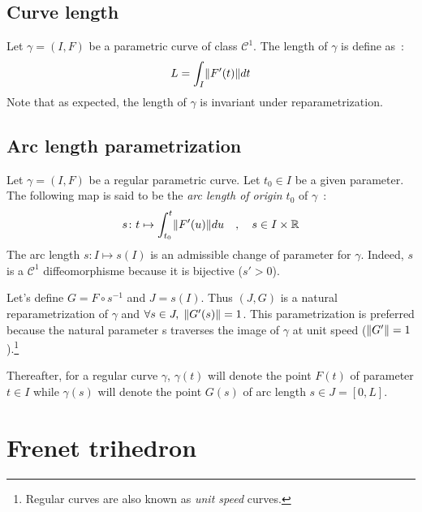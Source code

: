 \subsection{Curve length}
Let $\gamma=(I,F)$ be a parametric curve of class ${\mathcal{C}}^{1}$. The length of $\gamma$ is define as~:
\begin{equation}
	L=\int_{I}\lVert F'(t)\rVert dt
\end{equation}
Note that as expected, the length of $\gamma$ is invariant under reparametrization.

\subsection{Arc length parametrization}\label{sec:arclength_param}

Let $\gamma=(I,F)$ be a regular parametric curve. Let $t_0 \in I$ be a given parameter. The following map is said to be the \emph{arc length of origin $t_0$} of $\gamma$~:
\begin{equation}
	s \colon t \mapsto \int_{t_{0}}^{t}\lVert F'(u)\rVert du
	\quad,\quad
	s \in I \times \mathbb{R}
\end{equation}
The arc length $s \colon I\mapsto s(I)$ is an admissible change of parameter for $\gamma$. Indeed, $s$ is a ${\mathcal{C}}^{1}$ diffeomorphisme because it is bijective ($s'>0$).

Let's define $G=F\circ s^{-1}$ and $J=s(I)$. Thus $(J,G)$ is a natural reparametrization of $\gamma$ and  $\forall s \in J,\; \lVert G'(s)\rVert = 1$. This parametrization is preferred because the natural parameter s traverses the image of $\gamma$ at unit speed ($\lVert G'\rVert = 1$).\footnote{Regular curves are also known as \emph{unit speed} curves.}

Thereafter, for a regular curve $\gamma$, $\gamma(t)$ will denote the point $F(t)$ of parameter $t \in I$ while $\gamma(s)$ will denote the point $G(s)$ of arc length $s \in J=[0,L]$.


\section{Frenet trihedron}\label{sec:frenet_trihedron}

